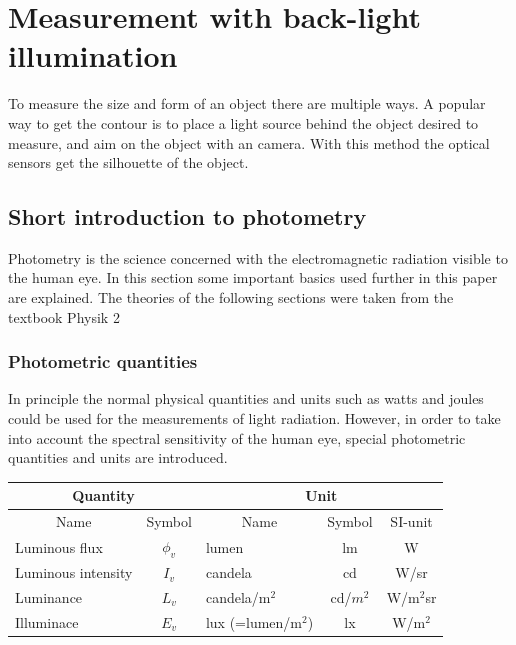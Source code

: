 \section{Measurement with back-light illumination}
To measure the size and form of an object there are multiple ways. A popular way to get the contour is to place a light source behind the object desired to measure, and aim on the object with an camera. With this method the optical sensors get the silhouette of the object. 
\subsection{Short introduction to photometry}
Photometry is the science concerned with the electromagnetic radiation visible to the human eye. In this section some important basics used further in this paper are explained. The theories of the following sections were taken from the textbook Physik 2 \cite{ruh}
\subsubsection{Photometric quantities}
In principle the normal physical quantities and units such as watts and joules could be used for the measurements of light radiation. However, in order to take into account the spectral sensitivity of the human eye, special photometric quantities and units are introduced.\\

\begin{table}[ht]
\centering
\begin{tabular}{ |p{5cm} p{2cm}|p{5cm} p{2cm} p{2cm}|  }
	\hline
	\multicolumn{2}{|c}{Quantity}&\multicolumn{3}{|c|}{Unit} \\
	\hline\hline
	\multicolumn{1}{|c}{Name}			& \multicolumn{1}{|c|}{Symbol}	& \multicolumn{1}{c}{Name}	& \multicolumn{1}{|c|}{Symbol}	& \multicolumn{1}{|c|}{SI-unit}\\

	\hline
	Luminous flux		& \multicolumn{1}{|c|}{$\phi_v$}	& lumen		& \multicolumn{1}{|c|}{lm}& \multicolumn{1}{|c|}{W}\\
	Luminous intensity 	& \multicolumn{1}{|c|}{$I_v$} 		& candela	& \multicolumn{1}{|c|}{cd}& \multicolumn{1}{|c|}{W/sr}\\
	Luminance			& \multicolumn{1}{|c|}{$L_v$}		& candela/$\text{m}^2$	& \multicolumn{1}{|c|}{cd/$m^2$}& \multicolumn{1}{|c|}{W/$\text{m}^2$sr}\\
	Illuminace 			& \multicolumn{1}{|c|}{$E_v$} 		& lux (=lumen/$\text{m}^2$) 	& \multicolumn{1}{|c|}{lx}& \multicolumn{1}{|c|}{W/$\text{m}^2$}\\

	\hline
\end{tabular}
\end{table}


